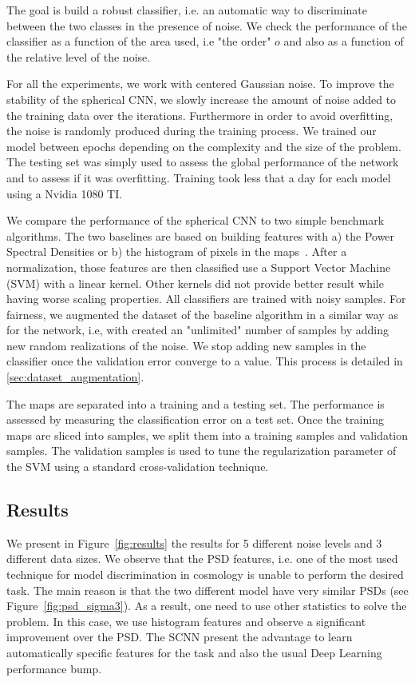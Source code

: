 \documentclass[final,twocolumn,3p,times,authoryear]{elsarticle}
\newcommand{\nati}[1]{{\color[rgb]{.1,.6,.1}{#1}}}
\newcommand{\todo}[1]{{\color[rgb]{.6,.1,.6}{#1}}}
\newcommand{\figref}[1]{Figure~\ref{fig:#1}}
\newcommand{\1}{\b{1}}              %
\newcommand{\0}{\b{0}}              %
\begin{document}
The goal is build a robust classifier, i.e. an automatic way to
discriminate between the two classes in the presence of noise. 
We check the performance of the classifier as a function of the area used, i.e "the order" $o$ and also as a function of the relative level of the noise.

For all the
experiments, we work with centered Gaussian noise. \todo{Tomek: could you put a
justification.} To improve the
stability of the spherical CNN, we slowly increase the amount of noise added to
the training data over the iterations. Furthermore in order to avoid
overfitting, the noise is randomly produced during the training process. We trained our
model between \nati{$50$ and $200$} epochs depending on the complexity and the size of
the problem. The testing set was simply used to assess the global performance of
the network and to assess if it was overfitting.
Training took less that a day for each model using a Nvidia 1080 TI.

We compare the performance of the spherical CNN to two simple benchmark
algorithms. The two baselines are based on building features with a) the Power
Spectral Densities or b) the histogram of pixels in the maps~\cite{patton2017cosmologicalconstraints}.
After a normalization, those features are then classified use a Support Vector
Machine (SVM) with a linear kernel. Other kernels did not provide better result
while having worse scaling properties. All classifiers are trained with noisy samples. For fairness, we augmented the dataset
of the baseline algorithm in a similar way as for the network, i.e, with
created an "unlimited" number of samples by adding new random realizations of
the noise. We stop adding new samples in the classifier once the validation
error converge to a value. This process is detailed in \ref{sec:dataset_augmentation}.

The maps are separated into a training and a testing set. The performance is
assessed by measuring the classification error on a test set. Once the
training maps are sliced into samples, we split them into a training samples
and validation samples. The validation samples is used to tune the
regularization parameter of the SVM using a standard cross-validation
technique.

\subsection{Results}

We present in \figref{results} the results for 5 different noise
levels and $3$ different data sizes.  We observe that the PSD features, i.e.
one of the most used technique for model discrimination in cosmology is unable
to perform the desired task. The main reason is that the two different model
have very similar PSDs (see \figref{psd_sigma3}).   As a result, one
need to use other statistics to solve the problem. In this case, we use
histogram features and observe a significant improvement over the PSD.  The
SCNN present the advantage to learn automatically specific features for the
task and also the usual Deep Learning performance bump.
\end{document}
